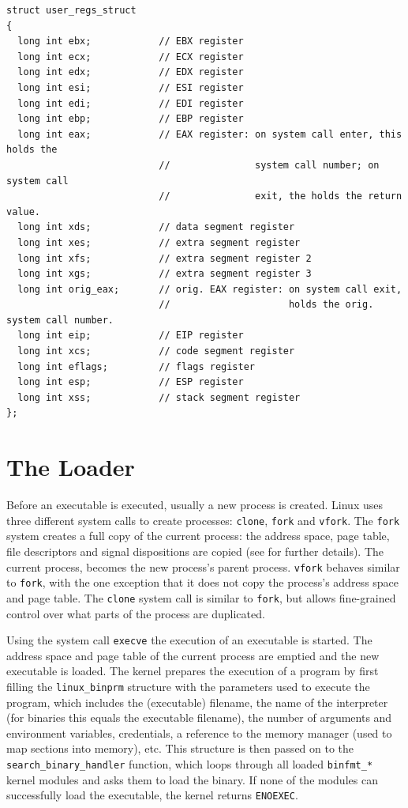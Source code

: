 \documentclass[draft,final]{vutinfth} %
\begin{document}
\begin{lstlisting}[caption={Definition of the 32-bit version of the \texttt{struct user\_regs\_struct} for reference}, label={lst:userregs}]
struct user_regs_struct
{
  long int ebx;            // EBX register
  long int ecx;            // ECX register
  long int edx;            // EDX register
  long int esi;            // ESI register
  long int edi;            // EDI register
  long int ebp;            // EBP register
  long int eax;            // EAX register: on system call enter, this holds the
                           //               system call number; on system call
                           //               exit, the holds the return value.
  long int xds;            // data segment register
  long int xes;            // extra segment register
  long int xfs;            // extra segment register 2
  long int xgs;            // extra segment register 3
  long int orig_eax;       // orig. EAX register: on system call exit,
                           //                     holds the orig. system call number.
  long int eip;            // EIP register
  long int xcs;            // code segment register
  long int eflags;         // flags register
  long int esp;            // ESP register
  long int xss;            // stack segment register
};
\end{lstlisting}

\section{The Loader}
\label{loader}

Before an executable is executed, usually a new process is created. Linux uses three different system calls to create processes: \texttt{clone}, \texttt{fork} and \texttt{vfork}. The \texttt{fork} system creates a full copy of the current process: the address space, page table, file descriptors and signal dispositions are copied (see \cite{ForkManPage} for further details). The current process, becomes the new process's parent process. \texttt{vfork} behaves similar to \texttt{fork}, with the one exception that it does not copy the process's address space and page table. The \texttt{clone} system call is similar to \texttt{fork}, but allows fine-grained control over what parts of the process are duplicated.

Using the system call \texttt{execve} the execution of an executable is started. The address space and page table of the current process are emptied and the new executable is loaded. The kernel prepares the execution of a program by first filling the \texttt{linux\_binprm} structure with the parameters used to execute the program, which includes the (executable) filename, the name of the interpreter (for binaries this equals the executable filename), the number of arguments and environment variables, credentials, a reference to the memory manager (used to map sections into memory), etc. This structure is then passed on to the \texttt{search\_binary\_handler} function, which loops through all loaded \texttt{binfmt\_*} kernel modules and asks them to load the binary. If none of the modules can successfully load the executable, the kernel returns \texttt{ENOEXEC}.
\end{document}
